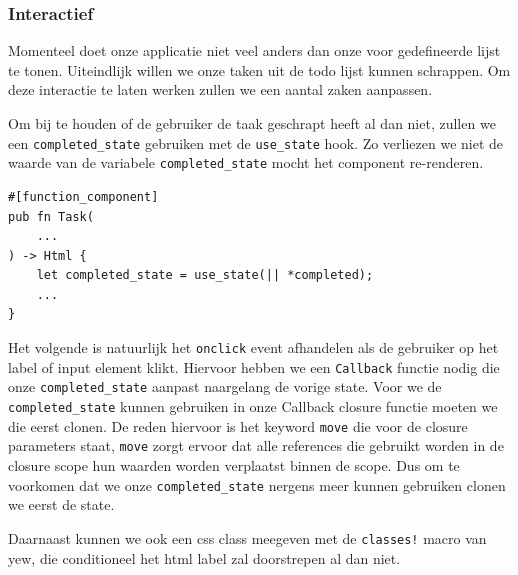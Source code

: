 \clearpage

\subsubsection{Interactief}
Momenteel doet onze applicatie niet veel anders dan onze voor gedefineerde lijst te tonen.
Uiteindlijk willen we onze taken uit de todo lijst kunnen schrappen. Om deze interactie te laten
werken zullen we een aantal zaken aanpassen.

Om bij te houden of de gebruiker de taak geschrapt heeft al dan niet, zullen we een
\texttt{completed_state} gebruiken met de \texttt{use_state} hook. Zo verliezen
we niet de waarde van de variabele \texttt{completed_state} mocht het component
re-renderen.

\begin{verbatim}
#[function_component]
pub fn Task(
    ...
) -> Html {
    let completed_state = use_state(|| *completed);
    ...
}
\end{verbatim}

Het volgende is natuurlijk het \texttt{onclick} event afhandelen als de gebruiker op het
label of input element klikt. Hiervoor hebben we een \texttt{Callback} functie nodig die
onze \texttt{completed_state} aanpast naargelang de vorige state. Voor we de
\texttt{completed_state} kunnen gebruiken in onze Callback closure functie moeten we die
eerst clonen. De reden hiervoor is het keyword \texttt{move} die voor de closure
parameters staat, \texttt{move} zorgt
ervoor dat alle references die gebruikt worden in de closure scope hun waarden worden verplaatst
binnen de scope. Dus om te voorkomen dat we onze \texttt{completed_state} nergens meer
kunnen gebruiken clonen we eerst de state.

Daarnaast kunnen we ook een css class meegeven met de \texttt{classes!} macro van yew, die
conditioneel het html label zal doorstrepen al dan niet.

\clearpage

